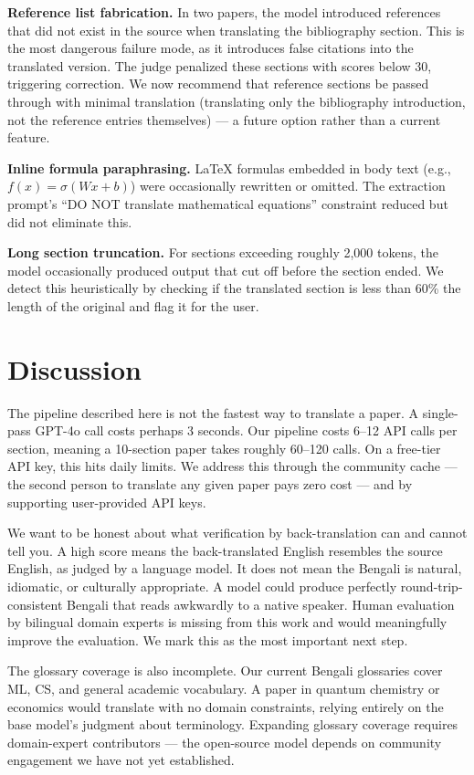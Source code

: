 \documentclass{article}
\begin{document}
\textbf{Reference list fabrication.} In two papers, the model introduced references that did not exist in the source when translating the bibliography section. This is the most dangerous failure mode, as it introduces false citations into the translated version. The judge penalized these sections with scores below 30, triggering correction. We now recommend that reference sections be passed through with minimal translation (translating only the bibliography introduction, not the reference entries themselves) --- a future option rather than a current feature.

\textbf{Inline formula paraphrasing.} LaTeX formulas embedded in body text (e.g., $f(x) = \sigma(Wx + b)$) were occasionally rewritten or omitted. The extraction prompt's ``DO NOT translate mathematical equations'' constraint reduced but did not eliminate this.

\textbf{Long section truncation.} For sections exceeding roughly 2,000 tokens, the model occasionally produced output that cut off before the section ended. We detect this heuristically by checking if the translated section is less than 60\% the length of the original and flag it for the user.

\section{Discussion}

The pipeline described here is not the fastest way to translate a paper. A single-pass GPT-4o call costs perhaps 3 seconds. Our pipeline costs 6--12 API calls per section, meaning a 10-section paper takes roughly 60--120 calls. On a free-tier API key, this hits daily limits. We address this through the community cache --- the second person to translate any given paper pays zero cost --- and by supporting user-provided API keys.

We want to be honest about what verification by back-translation can and cannot tell you. A high score means the back-translated English resembles the source English, as judged by a language model. It does not mean the Bengali is natural, idiomatic, or culturally appropriate. A model could produce perfectly round-trip-consistent Bengali that reads awkwardly to a native speaker. Human evaluation by bilingual domain experts is missing from this work and would meaningfully improve the evaluation. We mark this as the most important next step.

The glossary coverage is also incomplete. Our current Bengali glossaries cover ML, CS, and general academic vocabulary. A paper in quantum chemistry or economics would translate with no domain constraints, relying entirely on the base model's judgment about terminology. Expanding glossary coverage requires domain-expert contributors --- the open-source model depends on community engagement we have not yet established.
\end{document}
